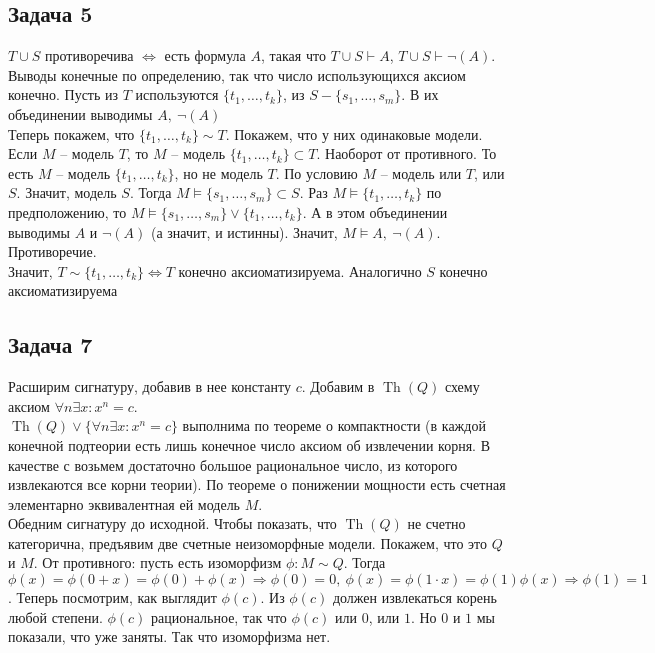 \subsection*{Задача 5}
	$T \cup S$ противоречива $\Leftrightarrow$ есть формула $A$, такая что $T \cup S \vdash A$, $T \cup S \vdash \neg(A)$. Выводы конечные по определению, так что число использующихся аксиом конечно. Пусть из $T$ используются $\{t_1, \ldots, t_k\}$, из $S - \{s_1, \ldots, s_m\}$. В их объединении выводимы $A,\ \neg(A)$\\
	Теперь покажем, что $\{t_1, \ldots, t_k\} \sim T$. Покажем, что у них одинаковые модели. Если $M$ -- модель $T$, то $M$ -- модель $\{t_1, \ldots, t_k\} \subset T$. Наоборот от противного. То есть $M$ -- модель $\{t_1, \ldots, t_k\}$, но не модель $T$. По условию $M$ -- модель или $T$, или $S$. Значит, модель $S$. Тогда $M \models \{s_1, \ldots, s_m\} \subset S$. Раз $M \models \{t_1, \ldots, t_k\}$ по предположению, то $M \models \{s_1, \ldots, s_m\} \vee \{t_1, \ldots, t_k\}$. А в этом объединении выводимы $A$ и $\neg(A)$ (а значит, и истинны). Значит, $M \models A,\ \neg(A)$. Противоречие.\\
	Значит, $T \sim \{t_1, \ldots, t_k\} \Leftrightarrow T$ конечно аксиоматизируема. Аналогично $S$ конечно аксиоматизируема
\vskip 0.4in

\subsection*{Задача 7}
	Расширим сигнатуру, добавив в нее константу $c$. Добавим в $\operatorname{Th}(Q)$ схему аксиом $\forall n \exists x: x^n = c$.\\
	$\operatorname{Th}(Q) \vee \{\forall n \exists x: x^n = c\}$ выполнима по теореме о компактности (в каждой конечной подтеории есть лишь конечное число аксиом об извлечении корня. В качестве с возьмем достаточно большое рациональное число, из которого извлекаются все корни теории). По теореме о понижении мощности есть счетная элементарно эквивалентная ей модель $M$.\\
	Обедним сигнатуру до исходной. Чтобы показать, что $\operatorname{Th}(Q)$ не счетно категорична, предъявим две счетные неизоморфные модели. Покажем, что это $Q$ и $M$. От противного: пусть есть изоморфизм $\phi: M \sim Q$. Тогда $\phi(x) = \phi(0 + x) = \phi(0) + \phi(x) \Rightarrow \phi(0) = 0,\ \phi(x) = \phi(1 \cdot x) = \phi(1)\phi(x) \Rightarrow \phi(1) = 1$. Теперь посмотрим, как выглядит $\phi(c)$. Из $\phi(c)$ должен извлекаться корень любой степени. $\phi(c)$ рациональное, так что $\phi(c)$ или $0$, или $1$. Но $0$ и $1$ мы показали, что уже заняты. Так что изоморфизма нет.
\vskip 0.4in

